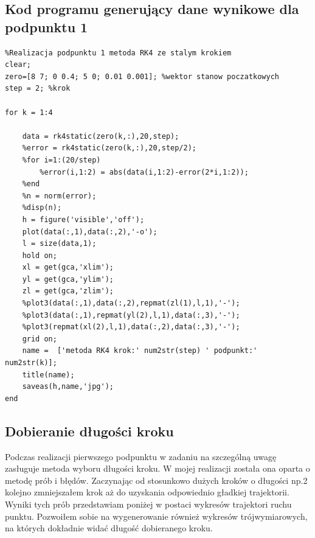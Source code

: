 \documentclass[a4paper, 11pt]{article}
\begin{document}
\subsection{Kod programu generujący dane wynikowe dla podpunktu 1}
\begin{lstlisting}
%Realizacja podpunktu 1 metoda RK4 ze stalym krokiem
clear; 
zero=[8 7; 0 0.4; 5 0; 0.01 0.001]; %wektor stanow poczatkowych
step = 2; %krok

for k = 1:4
    
    data = rk4static(zero(k,:),20,step);
    %error = rk4static(zero(k,:),20,step/2);
    %for i=1:(20/step)
        %error(i,1:2) = abs(data(i,1:2)-error(2*i,1:2));
    %end
    %n = norm(error);
    %disp(n); 
    h = figure('visible','off');
    plot(data(:,1),data(:,2),'-o');
    l = size(data,1);
    hold on;
    xl = get(gca,'xlim');
    yl = get(gca,'ylim');
    zl = get(gca,'zlim');
    %plot3(data(:,1),data(:,2),repmat(zl(1),l,1),'-');
    %plot3(data(:,1),repmat(yl(2),l,1),data(:,3),'-');
    %plot3(repmat(xl(2),l,1),data(:,2),data(:,3),'-');
    grid on;
    name =  ['metoda RK4 krok:' num2str(step) ' podpunkt:' num2str(k)]; 
    title(name);
    saveas(h,name,'jpg');
end
\end{lstlisting}

\subsection{Dobieranie długości kroku}
Podczas realizacji pierwszego podpunktu w zadaniu na szczególną uwagę zasługuje metoda wyboru długości kroku. W mojej realizacji została ona oparta o metodę prób i błędów. Zaczynając od stosunkowo dużych kroków o długości np.2 kolejno zmniejszałem krok aż do uzyskania odpowiednio gładkiej trajektorii. Wyniki tych prób przedstawiam poniżej w postaci wykresów trajektori ruchu punktu. Pozwoiłem sobie na wygenerowanie również wykresów trójwymiarowych, na których dokładnie widać długość dobieranego kroku. 
\end{document}
